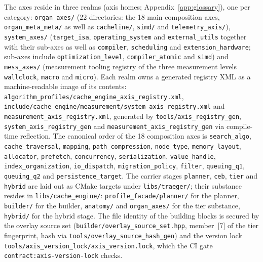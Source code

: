 The axes reside in three realms (axis homes; Appendix~\ref{app:glossary}), one per category: \texttt{organ\_\allowbreak{}axes/} (22 directories: the 18
main composition axes, \texttt{organ\_\allowbreak{}meta\_\allowbreak{}meta/} as well as \texttt{cacheline/}, \texttt{simd/} and
\texttt{telemetry\_\allowbreak{}axis/}), \texttt{system\_\allowbreak{}axes/} (\texttt{target\_\allowbreak{}isa}, \texttt{operating\_\allowbreak{}system} and
\texttt{external\_\allowbreak{}utils} together with their sub-axes as well as \texttt{compiler}, \texttt{scheduling} and
\texttt{extension\_\allowbreak{}hardware}; sub-axes include \texttt{optimization\_\allowbreak{}level}, \texttt{compiler\_\allowbreak{}atomic}
and \texttt{simd}) and \texttt{mess\_\allowbreak{}axes/} (measurement tooling registry of the three measurement levels
\texttt{wallclock}, \texttt{macro} and \texttt{micro}). Each realm owns a generated registry XML
as a machine-readable image of its contents:
\texttt{algorithm\_\allowbreak{}profiles/\allowbreak{}cache\_\allowbreak{}engine\_\allowbreak{}axis\_\allowbreak{}registry.xml},
\texttt{include/\allowbreak{}cache\_\allowbreak{}engine/\allowbreak{}measurement/\allowbreak{}system\_\allowbreak{}axis\_\allowbreak{}registry.xml}
and \texttt{measurement\_\allowbreak{}axis\_\allowbreak{}registry.xml}, generated by \texttt{tools/\allowbreak{}axis\_\allowbreak{}registry\_\allowbreak{}gen},
\texttt{system\_\allowbreak{}axis\_\allowbreak{}registry\_\allowbreak{}gen} and \texttt{measurement\_\allowbreak{}axis\_\allowbreak{}registry\_\allowbreak{}gen} via
compile-time reflection. The canonical order of the 18 composition axes is \texttt{search\_\allowbreak{}algo},
\texttt{cache\_\allowbreak{}traversal}, \texttt{mapping}, \texttt{path\_\allowbreak{}compression}, \texttt{node\_\allowbreak{}type},
\texttt{memory\_\allowbreak{}layout}, \texttt{allocator}, \texttt{prefetch}, \texttt{concurrency},
\texttt{serialization}, \texttt{value\_\allowbreak{}handle}, \texttt{index\_\allowbreak{}organization}, \texttt{io\_\allowbreak{}dispatch},
\texttt{migration\_\allowbreak{}policy}, \texttt{filter}, \texttt{queuing\_\allowbreak{}q1}, \texttt{queuing\_\allowbreak{}q2} and
\texttt{persistence\_\allowbreak{}target}. The carrier stages \texttt{planner}, \texttt{ceb}, \texttt{tier} and
\texttt{hybrid} are laid out as CMake targets under \texttt{libs/traeger/}; their substance resides in
\texttt{libs/cache\_\allowbreak{}engine/}: \texttt{profile\_\allowbreak{}facade/planner/} for the planner, \texttt{builder/} for the
builder, \texttt{anatomy/} and \texttt{organ\_\allowbreak{}axes/} for the tier substance, \texttt{hybrid/} for the
hybrid stage. The file identity of the building blocks is secured by the overlay source set
(\texttt{builder/\allowbreak{}overlay\_\allowbreak{}source\_\allowbreak{}set.hpp}, member~[7] of the tier fingerprint, hash via
\texttt{tools/\allowbreak{}overlay\_\allowbreak{}source\_\allowbreak{}hash\_\allowbreak{}gen}) and the version lock
\texttt{tools/\allowbreak{}axis\_\allowbreak{}version\_\allowbreak{}lock/\allowbreak{}axis\_\allowbreak{}version.lock}, which the CI gate
\texttt{contract:axis-version-lock} checks.

